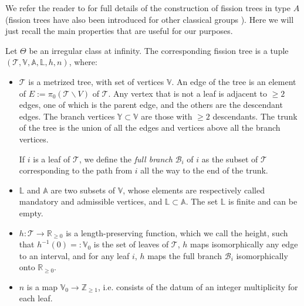 \documentclass[11pt,a4paper]{amsart}
\numberwithin{equation}{section}
\begin{document}
We refer the reader to  \cite[§3.4]{boalch2025twisted} for full details of the construction of fission trees in type $A$ (fission trees have also been introduced for other classical groups \cite{doucot2022local, doucot2025twisted}). Here we will just recall the main properties that are useful for our purposes. 

Let $\Theta$ be an irregular class at infinity. The corresponding fission tree is a tuple $(\mathcal T,\mathbb V,\mathbb A,\mathbb L, h,n)$, where:
\begin{itemize}
\item $\mathcal T$ is a metrized tree, with set of vertices $\mathbb V$. An edge of the tree is an element of $E:=\pi_0(\mathcal T \smallsetminus V)$ of $\mathcal T$. Any vertex that is not a leaf is adjacent to $\geq 2$ edges, one of which is the parent edge, and the others are the descendant edges. The branch vertices $\mathbb Y\subset \mathbb V$ are
those with $\geq 2$ descendants. The trunk of the
tree is the union of all the edges and vertices above all the branch vertices.

If $i$ is a leaf of $\mathcal T$, we define the \emph{full branch} $\mathcal B_i$ of $i$ as the subset of $\mathcal T$ corresponding to the path from $i$ all the way to the end of the trunk.
\item $\mathbb L$ and $\mathbb A$ are two subsets of $\mathbb V$, whose elements are respectively called mandatory and admissible vertices, and $\mathbb L\subset \mathbb A$. The set $\mathbb L$ is finite and can be empty.

\item $h:\mathcal T\to \mathbb R_{\geq 0}$ is a length-preserving function, which we call the height, such that $h^{-1}(0)=:\mathbb V_0$ is the set of leaves of $\mathcal T$, $h$ maps isomorphically any edge to an interval, and for any leaf $i$, $h$ maps the full branch $\mathcal B_i$ isomorphically onto $\mathbb R_{\geq 0}$.
\item $n$ is a map $\mathbb V_0\to \mathbb Z_{\geq 1}$, i.e. consists of the datum of an integer multiplicity for each leaf. 
\end{itemize}
\end{document}

